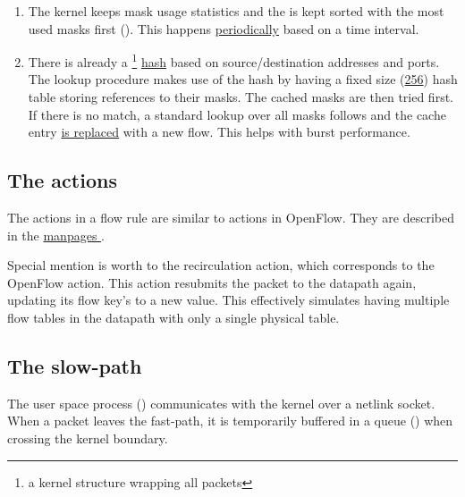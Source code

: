 \begin{enumerate}
\def\labelenumi{\arabic{enumi}.}
\item
  The kernel keeps mask usage statistics and the  is
  kept sorted with the most used masks first
  (\href{https://elixir.bootlin.com/linux/v6.2.5/source/net/openvswitch/flow_table.c\#L1107}{}).
  This happens
  \href{https://elixir.bootlin.com/linux/v6.2.5/source/net/openvswitch/datapath.c\#L2536}{periodically}
  based on a time interval.
\item
  There is already a \footnote{a kernel structure wrapping all packets}
  \href{https://elixir.bootlin.com/linux/v6.2.5/source/include/linux/skbuff.h\#L1537}{hash}
  based on source/destination addresses and ports. The lookup procedure
  makes use of the hash by having a fixed size
  (\href{https://elixir.bootlin.com/linux/v6.2.5/source/net/openvswitch/flow_table.c\#L41}{256})
  hash table storing references to their masks. The cached masks are
  then tried first. If there is no match, a standard lookup over all masks
  follows and the cache entry \href{https://elixir.bootlin.com/linux/v6.2.5/source/net/openvswitch/flow_table.c\#L842}{is replaced} with a new flow. This helps with burst performance.
\end{enumerate}

\subsection{The actions}
\label{subsec:ovs-actions}

The actions in a flow rule are similar to actions in OpenFlow. They are described in the \href{https://www.man7.org/linux/man-pages/man7/ovs-actions.7.html}{manpages }.

Special mention is worth to the recirculation action, which corresponds to the  OpenFlow action. This action resubmits the packet to the datapath again, updating its flow key's  to a new value. This effectively simulates having multiple flow tables in the datapath with only a single physical table.


\subsection{The slow-path}

The user space process (\href{https://www.man7.org/linux/man-pages/man8/ovs-vswitchd.8.html}{}) communicates with the kernel over a netlink socket. When a packet leaves the
fast-path, it is temporarily buffered in a queue (\href{https://elixir.bootlin.com/linux/v6.2.6/source/net/openvswitch/datapath.c\#L311}{}) when crossing the kernel boundary.

